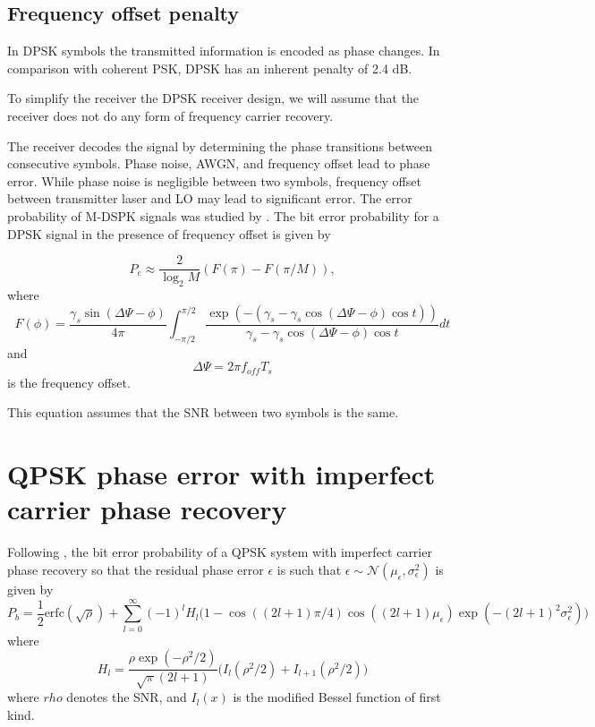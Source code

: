 \documentclass[a4paper]{article}
\begin{document}
\subsection{Frequency offset penalty}

In DPSK symbols the transmitted information is encoded as phase changes. In comparison with coherent PSK, DPSK has an inherent penalty of 2.4 dB.

To simplify the receiver the DPSK receiver design, we will assume that the receiver does not do any form of frequency carrier recovery. 

The receiver decodes the signal by determining the phase transitions between consecutive symbols. Phase noise, AWGN, and frequency offset lead to phase error. While phase noise is negligible between two symbols, frequency offset between transmitter laser and LO may lead to significant error. The error probability of M-DSPK signals was studied by \cite{Pawula2001}. The bit error probability for a DPSK signal in the presence of frequency offset is given by

\begin{equation}
P_e \approx \frac{2}{\log_2M}(F(\pi) - F(\pi/M)),
\end{equation}
where
\begin{equation}
F(\phi) = \frac{\gamma_s\sin(\Delta\Psi-\phi)}{4\pi}\int_{-\pi/2}^{\pi/2} \frac{\exp(-(\gamma_s -\gamma_s\cos(\Delta\Psi - \phi)\cos t))}{\gamma_s -\gamma_s\cos(\Delta\Psi - \phi)\cos t}dt
\end{equation}
and 
\begin{equation}
\Delta\Psi = 2\pi f_{off}T_s
\end{equation}
is the frequency offset.

This equation assumes that the SNR between two symbols is the same.

\section{QPSK phase error with imperfect carrier phase recovery}
Following \cite{Prabhu1976}, the bit error probability of a QPSK system with imperfect carrier phase recovery so that the residual phase error $\epsilon$ is such that $\epsilon \sim \mathcal{N}(\mu_\epsilon, \sigma_\epsilon^2)$ is given by
\begin{equation}
P_b = \frac{1}{2}\mathrm{erfc}(\sqrt{\rho}) + \sum_{l = 0}^\infty (-1)^lH_l\Big(1 - \cos((2l+1)\pi/4)\cos((2l+1)\mu_\epsilon)\exp(-(2l+1)^2\sigma_\epsilon^2)\Big)
\end{equation}
where
\begin{equation}
H_l = \frac{\rho\exp(-\rho^2/2)}{\sqrt{\pi}(2l+1)}\Big(I_l(\rho^2/2) + I_{l+1}(\rho^2/2)\Big)
\end{equation}
where $rho$ denotes the SNR, and $I_l(x)$ is the modified Bessel function of first kind.
\end{document}
